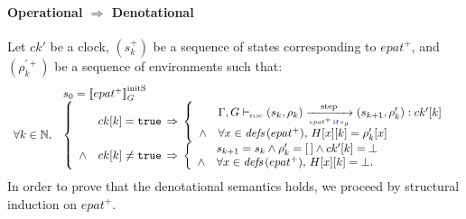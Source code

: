 \begin{skippableproof}
    \paragraph{Operational $\Rightarrow$ Denotational}
    \label{sec:semantics:grsync:theorems:equivalence:epat:proof:op_to_den}
    Let $ck'$ be a clock, $(s_k^+)$ be a sequence of states corresponding to $epat^+$, and
    $(\rho_k^{\prime+})$ be a sequence of environments such that:
    \begin{equation*}
        \begin{array}{ll}
                              & s_0 = \initstate{epat^+} \\
            \forall k \in \N, &
            \left\{
            \begin{array}{ll}
                       & ck[k] = \true \, \Rightarrow \,
                \left\{
                \begin{array}{ll}
                           & \epatOpsem{\rho_k}{s_k}{\guarded{epat^+}{e_g}}{s_{k+1}}{ck'[k]}{\rho'_k} \\
                    \wedge & \forall x \in \defs{epat^+}, \, H[x][k] = \rho'_k[x]                     \\
                \end{array}
                \right.                                     \\
                \wedge & ck[k] \neq \true \, \Rightarrow \,
                \left\{
                \begin{array}{ll}
                           & s_{k+1} = s_k \wedge \rho'_k = \emptyrho \wedge ck'[k] = \bot \\
                    \wedge & \forall x \in \defs{epat^+}, \, H[x][k] = \bot.               \\
                \end{array}
                \right.                                     \\
            \end{array}
            \right.
        \end{array}
    \end{equation*}
    In order to prove that the denotational semantics 
    holds, we proceed by structural induction on $epat^+$.


\end{skippableproof}
